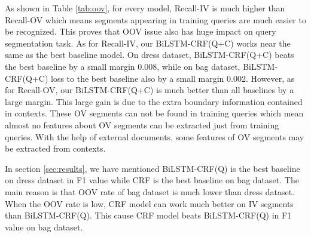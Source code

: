 As shown in Table \ref{tab:oov}, for every model, Recall-IV is much higher than Recall-OV which means segments appearing in training queries are much easier to be recognized. This proves that OOV issue also has huge impact on query segmentation task. As for Recall-IV, our BiLSTM-CRF(Q+C) works near the same as the best baseline model. On dress dataset, BiLSTM-CRF(Q+C) beats the best baseline by a small margin 0.008, while on bag dataset, BiLSTM-CRF(Q+C) loss to the best baseline also by a small margin 0.002. However, as for Recall-OV, our BiLSTM-CRF(Q+C) is much better than all baselines by a large margin. This large gain is due to the extra boundary information contained in contexts. These OV segments can not be found in training queries which mean almost no features about OV segments can be extracted just from training queries. With the help of external documents, some features of OV segments may be extracted from contexts.

In section \ref{sec:results}, we have mentioned BiLSTM-CRF(Q) is the best baseline on dress dataset in F1 value while CRF is the best baseline on bag dataset. The main reason is that OOV rate of bag dataset is much lower than dress dataset. When the OOV rate is low, CRF model can work much better on IV segments than BiLSTM-CRF(Q). This cause CRF model beats BiLSTM-CRF(Q) in F1 value on bag dataset.


